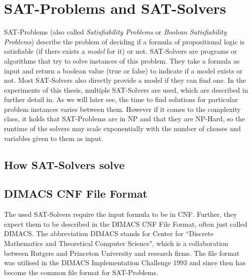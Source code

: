 \newpage
\section{SAT-Problems and SAT-Solvers}
SAT-Problems (also called \emph{Satisfiability Problems} or \emph{Boolean Satisfiability Problems}) describe the problem of deciding if a formula of propositional logic is satisfiable (if there exists a \emph{model} for it) or not. SAT-Solvers are programs or algorithms that try to solve instances of this problem. They take a formula as input and return a boolean value (true or false) to indicate if a model exists or not. Most SAT-Solvers also directly provide a model if they can find one. In the experiments of this thesis, multiple SAT-Solvers are used, which are described in further detail in. As we will later see, the time to find solutions for particular problem instances varies between them. However if it comes to the complexity class, it holds that SAT-Problems are in NP and that they are NP-Hard\cite{10.1145/800157.805047}\cite{levin1973universal}, so the runtime of the solvers may scale exponentially with the number of clauses and variables given to them as input.


\subsection{How SAT-Solvers solve}

\subsection{DIMACS CNF File Format}
The used SAT-Solvers require the input formula to be in CNF. Further, they expect them to be described in the DIMACS CNF File Format, often just called DIMACS. The abbreviation DIMACS stands for Center for ``Discrete Mathematics and Theoretical Computer Science", which is a collaboration between Rutgers and Princeton University and research firms. The file format was utilised in the DIMACS Implementation Challenge 1993 and since then has become the common file format for SAT-Problems.\\

